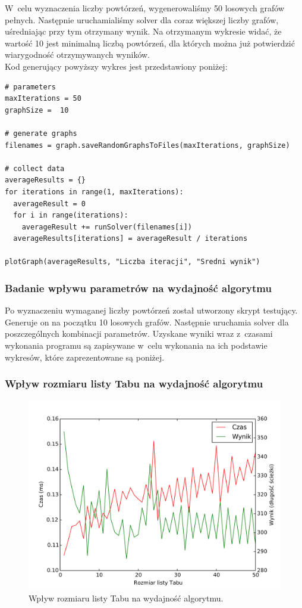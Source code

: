 \documentclass[11pt,a4paper]{article}
\begin{document}
W~celu wyznaczenia liczby powtórzeń, wygenerowaliśmy 50 losowych grafów pełnych. Następnie uruchamialiśmy solver dla coraz większej liczby grafów, uśredniając przy tym otrzymany wynik. Na otrzymanym wykresie widać, że wartość 10 jest minimalną liczbą powtórzeń, dla których można już potwierdzić wiarygodność otrzymywanych wyników.\\

Kod generujący powyższy wykres jest przedstawiony poniżej:

\newpage
\begin{lstlisting}[caption = Fragment kodu programu w języku Python generującego powyższy wykres]
# parameters
maxIterations = 50
graphSize =  10

# generate graphs
filenames = graph.saveRandomGraphsToFiles(maxIterations, graphSize)

# collect data
averageResults = {}
for iterations in range(1, maxIterations):
  averageResult = 0
  for i in range(iterations):
    averageResult += runSolver(filenames[i])
  averageResults[iterations] = averageResult / iterations

plotGraph(averageResults, "Liczba iteracji", "Sredni wynik")
\end{lstlisting}

\subsubsection{Badanie wpływu parametrów na wydajność algorytmu}
Po wyznaczeniu wymaganej liczby powtórzeń został utworzony skrypt testujący. Generuje on na początku 10 losowych grafów. Następnie uruchamia solver dla poszczególnych kombinacji parametrów. Uzyskane wyniki wraz z~czasami wykonania programu są zapisywane w~celu wykonania na ich podstawie wykresów, które zaprezentowane są poniżej.

\subsubsection{Wpływ rozmiaru listy Tabu na wydajność algorytmu}
\begin{figure}[H]
\includegraphics[trim = 0mm 3mm 0mm 12mm, clip, width=14cm]{graphs/tabuListSize.pdf}
\caption{Wpływ rozmiaru listy Tabu na wydajność algorytmu.}
\end{figure}
\end{document}

